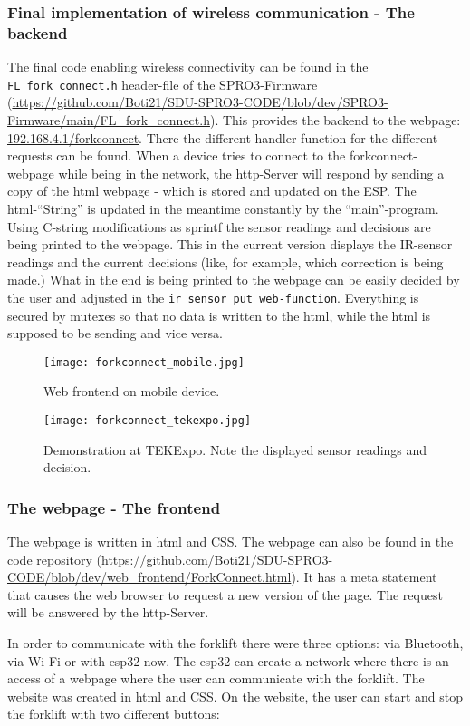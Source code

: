 \documentclass[../report.tex]{subfiles}
\begin{document}
\subsubsection{Final implementation of wireless communication - The backend}
The final code enabling wireless connectivity can be found in the 
\texttt{FL\_fork\_connect.h} header-file of the SPRO3-Firmware (\url{https://github.com/Boti21/SDU-SPRO3-CODE/blob/dev/SPRO3-Firmware/main/FL_fork_connect.h}).
This provides the backend to the webpage: \url{192.168.4.1/forkconnect}.
There the different handler-function for the different requests can be found.
When a device tries to connect to the forkconnect-webpage while being in the network,
the http-Server will respond by sending a copy of the html webpage - which is stored and updated on the ESP. The html-``String'' is updated in the 
meantime constantly by the ``main''-program. Using C-string modifications as sprintf the sensor readings
and decisions are being printed to the webpage. This in the current version displays the IR-sensor readings
and the current decisions (like, for example, which correction is being made.) What in the end is being 
printed to the webpage can be easily decided by the user and adjusted in the \texttt{ir\_sensor\_put\_web-function}.
Everything is secured by mutexes so that no data is written to the html, while the html is supposed
to be sending and vice versa. 
\begin{figure}[H]
    \centering
    \texttt{[image: forkconnect\_mobile.jpg]}
    \caption{Web frontend on mobile device.}
    
\end{figure} 
\begin{figure}[H]
    \centering
    \texttt{[image: forkconnect\_tekexpo.jpg]}
    \caption{Demonstration at TEKExpo. Note the displayed sensor readings and decision.}
\end{figure} 
\subsubsection{The webpage - The frontend}
The webpage is written in html and CSS. The webpage can also be found in the code 
repository (\url{https://github.com/Boti21/SDU-SPRO3-CODE/blob/dev/web_frontend/ForkConnect.html}).
It has a meta statement that causes the web browser to request a new version of the page.
The request will be answered by the http-Server. 

In order to communicate with the forklift there were three options: via Bluetooth, via Wi-Fi or with 
esp32 now. The esp32 can create a network where there is an access of a webpage where the user can 
communicate with the forklift. The website was created in html and CSS. On the website, the user can 
start and stop the forklift with two different buttons: 
\end{document}
